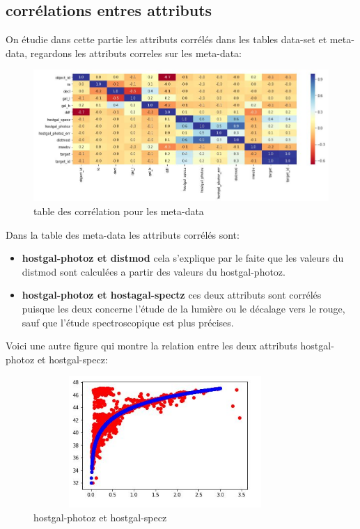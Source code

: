 \subsection{corrélations entres attributs}
On étudie dans cette partie les attributs corrélés dans les tables data-set et meta-data, regardons les attributs correles sur les meta-data: 
\begin{figure}[!h]
    \centering
    \includegraphics[width=17cm,height=5cm]{report/figures/correlation.jpg}
    \caption{table des corrélation pour les meta-data}
    \label{fig:my_label}
\end{figure}

Dans la table des meta-data les attributs corrélés sont: 
\begin{itemize}
    \item \textbf{hostgal-photoz et distmod} cela s'explique par le faite que les valeurs du distmod sont calculées a partir des valeurs du hostgal-photoz.
    \item \textbf{hostgal-photoz et hostagal-spectz} ces deux attributs sont corrélés puisque les deux concerne l'étude de la lumière ou le décalage vers le rouge, sauf que l'étude spectroscopique est plus précises.
\end{itemize}
Voici une autre figure qui montre la relation entre les deux attributs hostgal-photoz et hostgal-specz:

\begin{figure}[!h]
    \centering
    \includegraphics[width=10cm,height=5cm]{report/figures/redshift.jpg}
    \caption{hostgal-photoz et hostgal-specz}
    \label{fig:my_label}
\end{figure}

